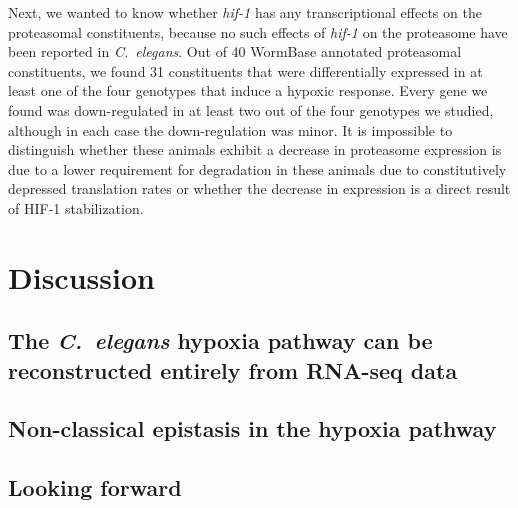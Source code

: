 \documentclass[9pt,twocolumn,twoside]{pnas-new}
\newcommand{\cel}{\emph{C.~elegans}}
\newcommand{\egl}{\emph{egl-9}}
\newcommand{\rhy}{\emph{rhy-1}}
\newcommand{\vhl}{\emph{vhl-1}}
\newcommand{\hif}{\emph{hif-1}}
\newcommand{\hifp}{HIF-1}
\begin{document}
Next, we wanted to know whether \hif{} has any transcriptional effects on the
proteasomal constituents, because no such effects of \hif{} on the proteasome
have been reported in \cel{}. Out of 40 WormBase annotated proteasomal constituents,
we found 31 constituents that were differentially expressed in at least one of the
four genotypes that induce a hypoxic response. Every gene we found was down-regulated
in at least two out of the four genotypes we studied, although in each case the
down-regulation was minor. It is impossible to distinguish whether these animals
exhibit a decrease in proteasome expression is due to a lower requirement for
degradation in these animals due to constitutively depressed translation rates or
whether the decrease in expression is a direct result of \hifp{} stabilization.



\section*{Discussion}
\subsection*{The \cel{} hypoxia pathway can be reconstructed entirely from
             RNA-seq data}

\subsection*{Non-classical epistasis in the hypoxia pathway}

\subsection{Looking forward}
\end{document}
